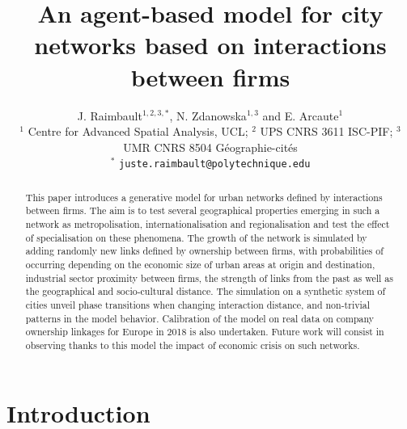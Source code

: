 \documentclass[11pt]{article}
\title{An agent-based model for city networks based on interactions between firms}
\date{}
\begin{document}
\author{J. Raimbault$^{1,2,3,\ast}$, N. Zdanowska$^{1,3}$ and E. Arcaute$^1$\\\medskip\small
$^{1}$ Centre for Advanced Spatial Analysis, UCL; $^{2}$ UPS CNRS 3611 ISC-PIF; $^{3}$ UMR CNRS 8504 G{\'e}ographie-cit{\'e}s\\
$^{\ast}$ \texttt{juste.raimbault@polytechnique.edu}
}

\maketitle

\begin{abstract}
    This paper introduces a generative model for urban networks defined by interactions between firms. The aim is to test several geographical properties emerging in such a network as metropolisation, internationalisation and regionalisation and test the effect of specialisation on these phenomena. The growth of the network is simulated by adding randomly new links defined by ownership between firms, with probabilities of occurring depending on the economic size of urban areas at origin and destination, industrial sector proximity between firms, the strength of links from the past as well as the geographical and socio-cultural distance. The simulation on a synthetic system of cities unveil phase transitions when changing interaction distance, and non-trivial patterns in the model behavior. Calibration of the model on real data on company ownership linkages for Europe in 2018 is also undertaken. Future work will consist in observing thanks to this model the impact of economic crisis on such networks.
    
    
\end{abstract}

\section{Introduction}
\end{document}
